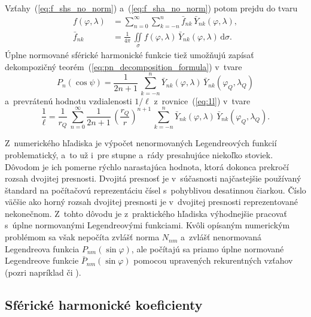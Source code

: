 \documentclass[a4paper,12pt]{book}
\newcommand{\diff}{\mathrm d}
\begin{document}
Vzťahy~(\ref{eq:f_shs_no_norm}) a~(\ref{eq:f_sha_no_norm}) potom prejdu do
tvaru
%
\begin{align}
\label{eq:f_shs}
f(\varphi, \lambda) &= \sum_{n = 0}^\infty \sum_{k = -n}^n \bar{f}_{nk} \,
\bar{Y}_{nk}(\varphi, \lambda){,}\\
%
\label{eq:f_sha}
\bar{f}_{nk} &= \frac{1}{4\pi} \, \iint\limits_{\sigma} f(\varphi, \lambda) \,
\bar{Y}_{nk}(\varphi, \lambda) \, \diff \sigma{.}
\end{align}
%
Úplne normované sférické harmonické funkcie tiež umožňujú zapísať dekompozičný
teorém~(\ref{eq:pn_decomposition_formula}) v~tvare
\parencite{MoritzPhysicalGeodesy}
%
\begin{equation}
P_n(\cos\psi) = \frac{1}{2n + 1} \, \sum_{k = -n}^n \bar{Y}_{nk}(\varphi,
\lambda) \, \bar{Y}_{nk}(\varphi_Q, \lambda_Q)
\end{equation}
%
a~prevrátenú hodnotu vzdialenosti $1 \slash \ell$ z~rovnice~(\ref{eq:1l}) 
v~tvare
%
\begin{equation}
\label{eq:1l_sh}
\frac{1}{\ell} = \frac{1}{r_Q} \, \sum_{n = 0}^{\infty} \frac{1}{2n + 1} \, 
\left( \frac{r_Q}{r} \right)^{n + 1} \, \sum_{k = -n}^n \bar{Y}_{nk}(\varphi,
\lambda) \, \bar{Y}_{nk}(\varphi_Q, \lambda_Q){.}
\end{equation}

Z~numerického hľadiska je výpočet nenormovaných Legendreových funkcií 
problematický, a~to už i~pre stupne a~rády presahujúce niekoľko stoviek.  
Dôvodom je ich pomerne rýchlo narastajúca hodnota, ktorá dokonca prekročí 
rozsah dvojitej presnosti.  Dvojitá presnosť je v~súčasnosti najčastejšie 
používaný štandard na počítačovú reprezentáciu čísel s~pohyblivou desatinnou 
čiarkou.  Číslo väčšie ako horný rozsah dvojitej presnosti je v~dvojitej 
presnosti reprezentované nekonečnom.  Z~tohto dôvodu je z~praktického hľadiska 
výhodnejšie pracovať s~úplne normovanými Legendreovými funkciami.  Kvôli 
opísaným numerickým problémom sa však nepočíta zvlášť norma $N_{nm}$ a~zvlášť 
nenormovaná Legendreova funkcia $P_{nm}(\sin\varphi)$, ale počítajú sa priamo 
úplne normované Legendreove funkcie $\bar{P}_{nm}(\sin\varphi)$ pomocou 
upravených rekurentných vzťahov (pozri napríklad \cite{Holmes2002a} či 
\cite{Fukushima2012a}).



\subsection{Sférické harmonické koeficienty}
\label{sec:shc_norm}
\end{document}
